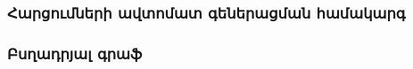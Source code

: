 {
	\subsubsection{Հարցումների ավտոմատ գեներացման համակարգ}\label{subsubsec:queryAggregation}
	

	\subsubsection{Բսղադրյալ գրաֆ}\label{subsubsec:proceduregraph}
	
}
